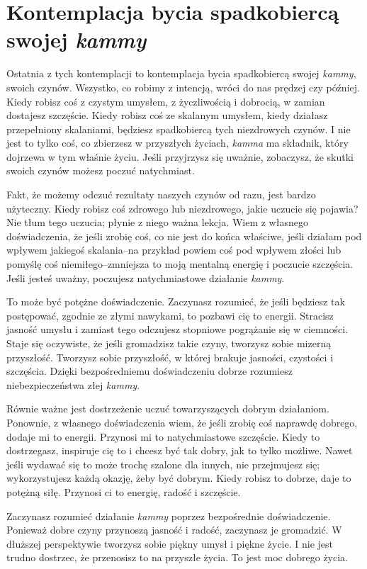 \documentclass[12pt,openany]{book}
\begin{document}
\section*{Kontemplacja bycia spadkobiercą swojej \textit{kammy}}

Ostatnia z tych kontemplacji to kontemplacja bycia spadkobiercą swojej \textit{kammy}, swoich czynów. Wszystko, co robimy z intencją, wróci do nas prędzej czy później. Kiedy robisz coś z czystym umysłem, z życzliwością i dobrocią, w zamian dostajesz szczęście. Kiedy robisz coś ze skalanym umysłem, kiedy działasz przepełniony skalaniami, będziesz spadkobiercą tych niezdrowych czynów. I nie jest to tylko coś, co zbierzesz w przyszłych życiach, \textit{kamma} ma składnik, który dojrzewa w tym właśnie życiu. Jeśli przyjrzysz się uważnie, zobaczysz, że skutki swoich czynów możesz poczuć natychmiast.

Fakt, że możemy odczuć rezultaty naszych czynów od razu, jest bardzo użyteczny. Kiedy robisz coś zdrowego lub niezdrowego, jakie uczucie się pojawia? Nie tłum tego uczucia; płynie z niego ważna lekcja. Wiem z własnego doświadczenia, że jeśli zrobię coś, co nie jest do końca właściwe, jeśli działam pod wpływem jakiegoś skalania–na przykład powiem coś pod wpływem złości lub pomyślę coś niemiłego–zmniejsza to moją mentalną energię i poczucie szczęścia. Jeśli jesteś uważny, poczujesz natychmiastowe działanie \textit{kammy}.

To może być potężne doświadczenie. Zaczynasz rozumieć, że jeśli będziesz tak postępować, zgodnie ze złymi nawykami, to pozbawi cię to energii. Stracisz jasność umysłu i zamiast tego odczujesz stopniowe pogrążanie się w ciemności. Staje się oczywiste, że jeśli gromadzisz takie czyny, tworzysz sobie mizerną przyszłość. Tworzysz sobie przyszłość, w której brakuje jasności, czystości i szczęścia. Dzięki bezpośredniemu doświadczeniu dobrze rozumiesz niebezpieczeństwa złej \textit{kammy}.

Równie ważne jest dostrzeżenie uczuć towarzyszących dobrym działaniom. Ponownie, z własnego doświadczenia wiem, że jeśli zrobię coś naprawdę dobrego, dodaje mi to energii. Przynosi mi to natychmiastowe szczęście.  Kiedy to dostrzegasz, inspiruje cię to i chcesz być tak dobry, jak to tylko możliwe. Nawet jeśli wydawać się to może trochę szalone dla innych, nie przejmujesz się; wykorzystujesz każdą okazję, żeby być dobrym. Kiedy robisz to dobrze, daje to potężną siłę. Przynosi ci to energię, radość i szczęście.

Zaczynasz rozumieć działanie \textit{kammy} poprzez bezpośrednie doświadczenie. Ponieważ dobre czyny przynoszą jasność i radość, zaczynasz je gromadzić. W dłuższej perspektywie tworzysz sobie piękny umysł i piękne życie. I nie jest trudno dostrzec, że przenosisz to na przyszłe życia. To jest moc dobrego życia.
\end{document}
